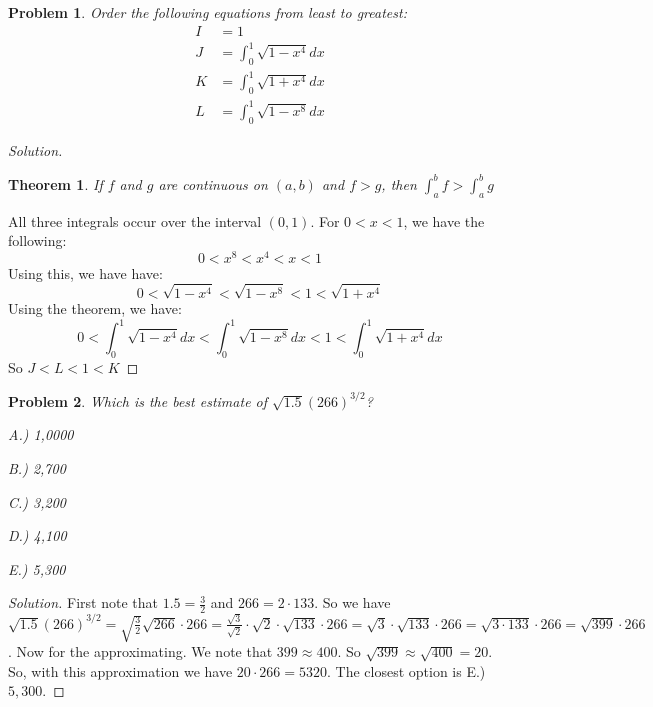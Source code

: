 \documentclass[crop=false,class=book]{standalone}
\theoremstyle{mystyle}
\newtheorem{problem}{Problem}[section]
\newtheorem*{theorem*}{Theorem}
\begin{document}
\begin{problem}
Order the following equations from least to greatest:
\begin{align*}
    I&=1\\
    J&=\int_{0}^{1}\sqrt{1-x^{4}}dx\\
    K&=\int_{0}^{1}\sqrt{1+x^{4}}dx\\
    L&=\int_{0}^{1}\sqrt{1-x^{8}}dx
\end{align*}
\end{problem}
\begin{proof}[Solution]
\begin{theorem*}
If $f$ and $g$ are continuous on $(a,b)$ and $f>g$, then $\int_{a}^{b}f>\int_{a}^{b}g$
\end{theorem*}
All three integrals occur over the interval $(0,1)$. For $0 < x < 1$, we have the following:
\begin{equation*}
    0<x^{8}<x^{4}<x<1
\end{equation*}
Using this, we have have:
\begin{equation*}
    0<\sqrt{1-x^{4}}<\sqrt{1-x^{8}}<1<\sqrt{1+x^{4}}
\end{equation*}
Using the theorem, we have:
\begin{equation*}
    0<\int_{0}^{1}\sqrt{1-x^4}dx<\int_{0}^{1}\sqrt{1-x^8}dx<1<\int_{0}^{1}\sqrt{1+x^4}dx
\end{equation*}
So $J<L<1<K$
\end{proof}
\begin{problem}
Which is the best estimate of $\sqrt{1.5}(266)^{3/2}$?
\begin{enumerate}
    \begin{multicols}{5}
    \item[A.)] 1,0000
    \item[B.)] 2,700
    \item[C.)] 3,200
    \item[D.)] 4,100
    \item[E.)] 5,300
    \end{multicols}
\end{enumerate}
\end{problem}
\begin{proof}[Solution]
First note that $1.5 = \frac{3}{2}$ and $266 = 2\cdot 133$. So we have $\sqrt{1.5}(266)^{3/2} = \sqrt{\frac{3}{2}}\sqrt{266}\cdot 266 = \frac{\sqrt{3}}{\sqrt{2}}\cdot \sqrt{2}\cdot \sqrt{133}\cdot 266 = \sqrt{3}\cdot \sqrt{133}\cdot 266 = \sqrt{3\cdot 133}\cdot 266 = \sqrt{399}\cdot 266$. Now for the approximating. We note that $399 \approx 400$. So $\sqrt{399} \approx \sqrt{400} = 20$. So, with this approximation we have $20\cdot 266 = 5320$. The closest option is E.) $5,300$.
\end{proof}
\end{document}
